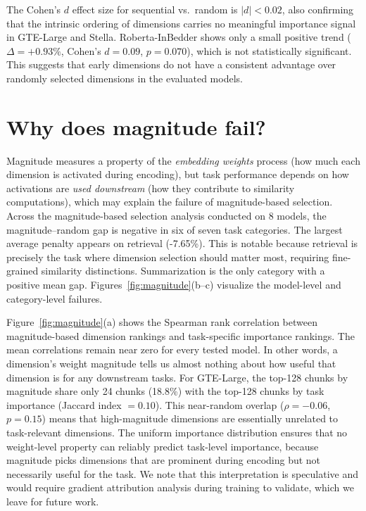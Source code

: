 \documentclass[11pt,a4paper]{article}
\begin{document}
The Cohen's $d$ effect size for sequential vs.\ random is $|d| < 0.02$, also confirming that the intrinsic ordering of dimensions carries no meaningful importance signal in GTE-Large and Stella. Roberta-InBedder shows only a small positive trend ($\Delta = +0.93\%$, Cohen's $d = 0.09$, $p = 0.070$), which is not statistically significant. This suggests that early dimensions do not have a consistent advantage over randomly selected dimensions in the evaluated models.

\section{Why does magnitude fail?}
\label{magnitude}

Magnitude measures a property of the \emph{embedding weights} process (how much each dimension is activated during encoding), but task performance depends on how activations are \emph{used downstream} (how they contribute to similarity computations), which may explain the failure of magnitude-based selection. Across the magnitude-based selection analysis conducted on 8 models, the magnitude--random gap is negative in six of seven task categories. The largest average penalty appears on retrieval (-7.65\%). This is notable because retrieval is precisely the task where dimension selection should matter most, requiring fine-grained similarity distinctions. Summarization is the only category with a positive mean gap. Figures~\ref{fig:magnitude}(b--c) visualize the model-level and category-level failures. 

Figure~\ref{fig:magnitude}(a) shows the Spearman rank correlation between magnitude-based dimension rankings and task-specific importance rankings. The mean correlations remain near zero for every tested model. In other words, a dimension's weight magnitude tells us almost nothing about how useful that dimension is for any downstream tasks. For GTE-Large, the top-128 chunks by magnitude share only 24 chunks (18.8\%) with the top-128 chunks by task importance (Jaccard index $= 0.10$). This near-random overlap ($\rho = -0.06$, $p = 0.15$) means that high-magnitude dimensions are essentially unrelated to task-relevant dimensions. The uniform importance distribution ensures that no weight-level property can reliably predict task-level importance, because magnitude picks dimensions that are prominent during encoding but not necessarily useful for the task. We note that this interpretation is speculative and would require gradient attribution analysis during training to validate, which we leave for future work.
\end{document}
